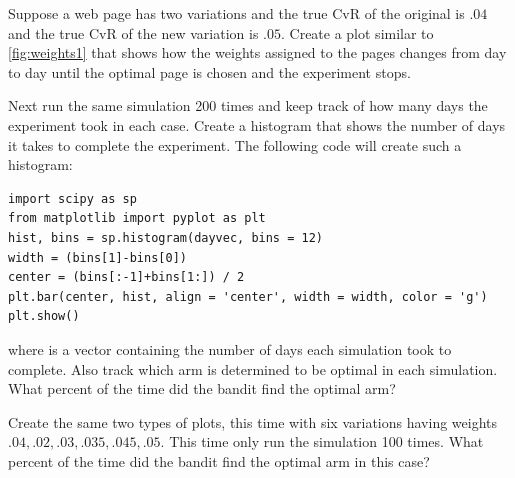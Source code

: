 \begin{problem}
Suppose a web page has two variations and the true CvR of the original is 
$.04$ and the true CvR of the new variation is $.05$. 
Create a plot similar to \ref{fig:weights1} that shows how the weights 
assigned to the pages changes from day to day until the optimal page is chosen and the experiment stops.

Next run the same simulation 200 times and keep track of how many days 
the experiment took in each case.  Create a histogram that shows the 
number of days it takes to complete the experiment.  
The following code will create such a histogram:
\begin{lstlisting}
import scipy as sp
from matplotlib import pyplot as plt
hist, bins = sp.histogram(dayvec, bins = 12)
width = (bins[1]-bins[0])
center = (bins[:-1]+bins[1:]) / 2
plt.bar(center, hist, align = 'center', width = width, color = 'g')
plt.show()
\end{lstlisting}
where  is a vector containing the number of days each simulation took to complete. 
Also track which arm is determined to be optimal in each simulation.  
What percent of the time did the bandit find the optimal arm?

Create the same two types of plots, this time with six variations having 
weights $.04,.02,.03,.035,.045,.05$.  This time only run the simulation 100 times.  
What percent of the time did the bandit find the optimal arm in this case?
\end{problem}

